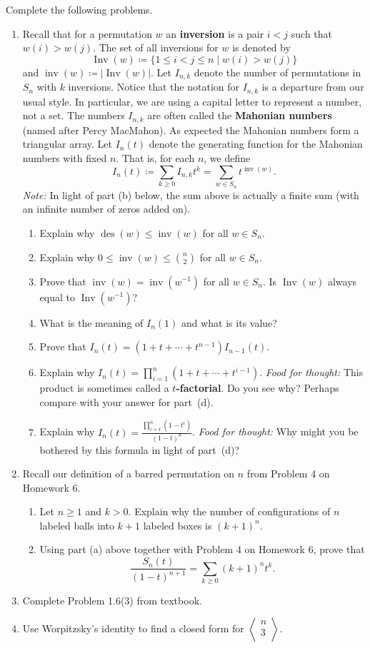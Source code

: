 \documentclass[11pt]{article}%
\theoremstyle{definition}
\DeclareMathOperator{\des}{des}
\DeclareMathOperator{\Inv}{Inv}
\DeclareMathOperator{\inv}{inv}
\newcommand{\euler}[2]{
  \displaystyle \left\langle\begin{matrix}#1  \\#2  \\ \end{matrix}\right\rangle}
\begin{document}
Complete the following problems. 
\begin{enumerate}
\item Recall that for a permutation $w$ an \textbf{inversion} is a pair $i<j$ such that $w(i)>w(j)$.  The set of all inversions for $w$ is denoted by
\[
\Inv(w)\coloneqq \{1\leq i<j\leq n\mid w(i)>w(j)\}
\] 
and $\inv(w)\coloneqq |\Inv(w)|$. Let $I_{n,k}$ denote the number of permutations in $S_n$ with $k$ inversions.  Notice that the notation for $I_{n,k}$ is a departure from our usual style.  In particular, we are using a capital letter to represent a number, not a set. The numbers $I_{n,k}$ are often called the \textbf{Mahonian numbers} (named after Percy MacMahon). As expected the Mahonian numbers form a triangular array. Let $I_n(t)$ denote the generating function for the Mahonian numbers with fixed $n$. That is, for each $n$, we define
\[
I_n(t)\coloneqq \sum_{k\geq 0}I_{n,k}t^k=\sum_{w\in S_n} t^{\inv(w)}.
\]
\emph{Note:} In light of part (b) below, the sum above is actually a finite sum (with an infinite number of zeros added on).
\begin{enumerate}
\item Explain why $\des(w)\leq \inv(w)$ for all $w\in S_n$.
\item Explain why $0\leq \inv(w)\leq \binom{n}{2}$ for all $w\in S_n$.
\item Prove that $\inv(w)=\inv(w^{-1})$ for all $w\in S_n$. Is $\Inv(w)$ always equal to $\Inv(w^{-1})$?
\item What is the meaning of $I_n(1)$ and what is its value?
\item Prove that $I_n(t)=(1+t+\cdots +t^{n-1})I_{n-1}(t)$.
\item Explain why $I_n(t)=\prod_{i=1}^n (1+t+\cdots +t^{i-1})$. \emph{Food for thought:} This product is sometimes called a \textbf{$t$-factorial}. Do you see why? Perhaps compare with your answer for part~(d).
\item Explain why $\displaystyle I_n(t)=\frac{\prod_{i=1}^n(1-t^i)}{(1-t)^n}$. \emph{Food for thought:} Why might you be bothered by this formula in light of part~(d)?
\end{enumerate}
\item Recall our definition of a barred permutation on $n$ from Problem 4 on Homework 6.
\begin{enumerate}
\item Let $n\geq 1$ and $k>0$. Explain why the number of configurations of $n$ labeled balls into $k+1$ labeled boxes is $(k+1)^n$.
\item Using part (a) above together with Problem 4 on Homework 6, prove that
\[
\frac{S_n(t)}{(1-t)^{n+1}}=\sum_{k\geq 0}(k+1)^nt^k.
\]
\end{enumerate}
\item Complete Problem 1.6(3) from textbook.
\item Use Worpitzsky's identity to find a closed form for $\euler{n}{3}$.
\end{enumerate}
\end{document}
